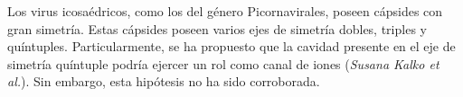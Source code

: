 \documentclass[8pt]{beamer}
\begin{document}
\begin{frame}[t]
\justifying
Los virus icosaédricos, como los del género Picornavirales, poseen cápsides con gran simetría. Estas cápsides poseen varios ejes de simetría dobles, triples y quíntuples. Particularmente, se ha propuesto que la cavidad presente en el eje de simetría quíntuple podría ejercer un rol como canal de iones (\textit{Susana Kalko et al.}). Sin embargo, esta hipótesis no ha sido corroborada.

\end{frame}
\end{document}
